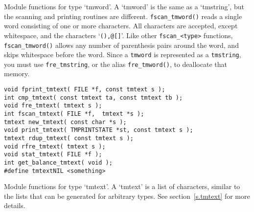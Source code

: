 \begin{desc}
Module functions for type `tmword'.
A `tmword' is the same as a `tmstring', but the scanning and printing
routines are different. \verb'fscan_tmword()' reads a single word
consisting of one or more characters. All characters are accepted,
except whitespace, and the characters `\verb'(),@[]''.
Like other \verb'fscan_<type>' functions, \verb'fscan_tmword()' allows
any number of parenthesis pairs around the word, and skips
whitespace before the word.
Since a \verb'tmword' is represented as a \verb'tmstring',
you must use \verb'fre_tmstring', or the alias {\tt fre\_tmword()},
to deallocate that memory.
\end{desc}
\begin{verbatim}
void fprint_tmtext( FILE *f, const tmtext s );
int cmp_tmtext( const tmtext ta, const tmtext tb );
void fre_tmtext( tmtext s );
int fscan_tmtext( FILE *f,  tmtext *s );
tmtext new_tmtext( const char *s );
void print_tmtext( TMPRINTSTATE *st, const tmtext s );
tmtext rdup_tmtext( const tmtext s );
void rfre_tmtext( tmtext s );
void stat_tmtext( FILE *f );
int get_balance_tmtext( void );
#define tmtextNIL <something>
\end{verbatim}
\begin{desc}
Module functions for type `tmtext'.
A `tmtext' is a list of characters, similar to the lists that can be
generated for arbitrary types. See section~\ref{s.tmtext} for more details.
\end{desc}
